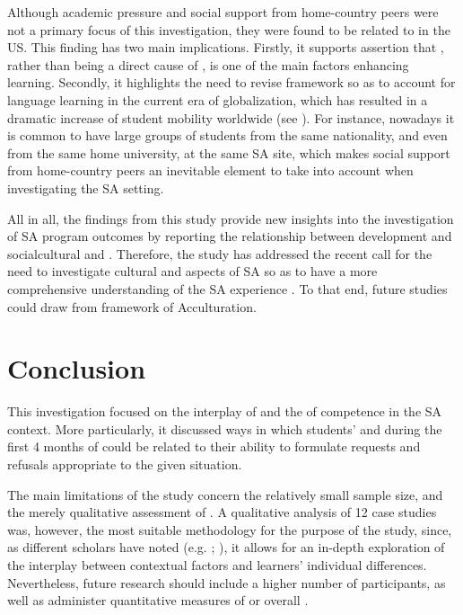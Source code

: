 \documentclass[output=paper]{langsci/langscibook}
\begin{document}
Although academic pressure and social support from home-country peers were not a primary focus of this investigation, they were found to be related to  in the US. This finding has two main implications. Firstly, it supports  assertion that , rather than being a direct cause of  , is one of the main factors enhancing  learning. Secondly, it highlights the need to revise  framework so as to account for language learning in the current era of globalization, which has resulted in a dramatic increase of student mobility worldwide (see \citealt{MitchellEtAl2015,MitchellEtAl2017}). For instance, nowadays it is common to have large groups of students from the same nationality, and even from the same home university, at the same SA site, which makes social support from home-country peers an inevitable element to take into account when investigating the SA setting. 

All in all, the findings from this study provide new insights into the investigation of SA program outcomes by reporting the relationship between  development and socialcultural and . Therefore, the study has addressed the recent call for the need to investigate cultural and  aspects of SA so as to have a more comprehensive understanding of the SA experience \citep{Taguchi2015crosscultural}. To that end, future studies could draw from  framework of Acculturation.


\section{Conclusion}

This investigation focused on the interplay of  and the  of  competence in the SA context. More particularly, it discussed ways in which students’  and  during the first 4 months of  could be related to their ability to formulate requests and refusals appropriate to the given situation.

  
The main limitations of the study concern the relatively small sample size, and the merely qualitative assessment of . A qualitative analysis of 12 case studies was, however, the most suitable methodology for the purpose of the study, since, as different scholars have noted (e.g. \citealt{DörnyeiEtAl2004}; \citealt{Taguchi2011}), it allows for an in-depth exploration of the interplay between contextual factors and learners’ individual differences. Nevertheless, future research should include a higher number of participants, as well as administer quantitative measures of  or overall .
\end{document}

